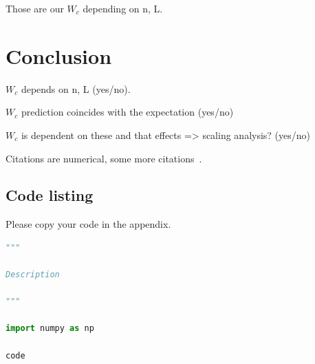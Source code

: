 \documentclass[reprint,amsmath,amssymb,aps,prb]{revtex4-2}
\begin{document}
Those are our $W_c$ depending on n, L.

\section{Conclusion}%

$W_c$ depends on n, L (yes/no).

$W_c$ prediction coincides with the expectation (yes/no)

$W_c$ is dependent on these and that effects => scaling analysis? (yes/no)

Citations are numerical\cite{epr}, some more citations~\cite{feyn54,Bire82,Berman1983,witten2001,Davies1998}. 




\appendix


\begin{widetext}
\section{Code listing} \label{app:codes}
Please copy your code in the appendix.
\begin{lstlisting}[language=Python]
"""

Description

"""

import numpy as np

code
\end{lstlisting}
\end{widetext}
\end{document}
